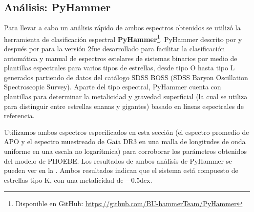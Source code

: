 \subsection{Análisis: PyHammer}

Para llevar a cabo un análisis rápido de ambos espectros obtenidos se utilizó la
herramienta de clasificación espectral \textbf{PyHammer}\footnote{Disponible en
GitHub: \url{https://github.com/BU-hammerTeam/PyHammer}}. PyHammer\textemdash
descrito por
y después por
para la versión 2\textemdash fue desarrollado para facilitar la clasificación
automática y manual de espectros estelares de sistemas binarios por medio de
plantillas espectrales para varios tipos de estrellas, desde tipo O hasta tipo L
generados partiendo de datos del catálogo SDSS BOSS (SDSS Baryon Oscillation
Spectroscopic Survey). Aparte del tipo espectral, PyHammer cuenta con plantillas
para determinar la metalicidad y gravedad superficial (la cual se utiliza para
distinguir entre estrellas enanas y gigantes) basado en líneas espectrales de
referencia. 

Utilizamos ambos espectros especificados en esta sección (el espectro promedio
de APO y el espectro muestreado de Gaia DR3 en una malla de longitudes de onda
uniforme en una escala no logarítmica) para corroborar los parámetros obtenidos
del modelo de PHOEBE. Los resultados de ambos análisis de PyHammer se pueden ver
en la . Ambos resultados indican que el sistema
está compuesto de estrellas tipo K, con una metalicidad de $-0.5 \mathrm{dex}$. 

